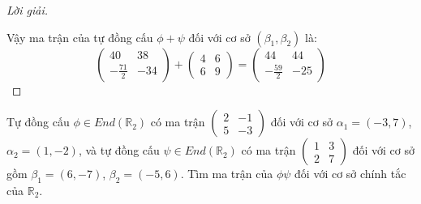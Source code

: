 \documentclass[class=nhvh-linear-algebra,crop=false]{standalone}
\begin{document}
\begin{proof}[Lời giải]
\[    \]
    \par Vậy ma trận của tự đồng cấu $\phi + \psi$ đối với cơ sở $(\beta_{1}, \beta_{2})$ là:
    \[
        \begin{pmatrix}
            40            & 38  \\
            -\frac{71}{2} & -34
        \end{pmatrix}
        +
        \begin{pmatrix}
            4 & 6 \\
            6 & 9
        \end{pmatrix}
        =
        \begin{pmatrix}
            44            & 44  \\
            -\frac{59}{2} & -25
        \end{pmatrix}
    \]
\end{proof}

\begin{exercise}
    Tự đồng cấu $\phi\in End(\mathbb{R}_{2})$ có ma trận $\begin{pmatrix} 2 & -1 \\ 5 & -3 \end{pmatrix}$ đối với cơ sở $\alpha_{1} = (-3, 7)$, $\alpha_{2} = (1, -2)$, và tự đồng cấu $\psi\in End(\mathbb{R}_{2})$ có ma trận $\begin{pmatrix} 1 & 3 \\ 2 & 7 \end{pmatrix}$ đối với cơ sở gồm $\beta_{1} = (6, -7)$, $\beta_{2} = (-5, 6)$. Tìm ma trận của $\phi\psi$ đối với cơ sở chính tắc của $\mathbb{R}_{2}$.
\end{exercise}
\end{document}
